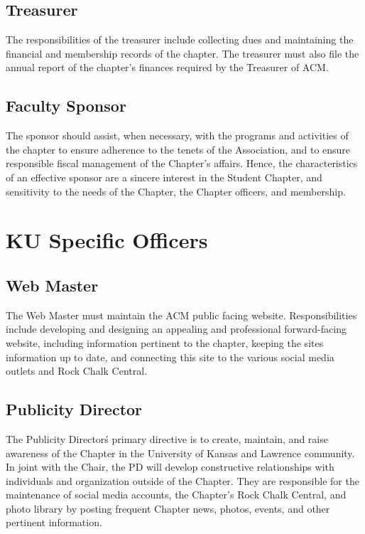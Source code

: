 \subsection*{Treasurer}
The responsibilities of the treasurer include collecting dues and maintaining
the financial and membership records of the chapter. The treasurer must also
file the annual report of the chapter's finances required by the Treasurer of
ACM.

\subsection*{Faculty Sponsor}
The sponsor should assist, when necessary, with the programs and activities of
the chapter to ensure adherence to the tenets of the Association, and to ensure
responsible fiscal management of the Chapter's affairs. Hence, the
characteristics of an effective sponsor are a sincere interest in the Student
Chapter, and sensitivity to the needs of the Chapter, the Chapter officers, and
membership.

\section*{KU Specific Officers}

\subsection*{Web Master}
The Web Master must maintain the ACM public facing website. Responsibilities
include developing and designing an appealing and professional forward-facing
website, including information pertinent to the chapter, keeping the site\’s
information up to date, and connecting this site to the various social media
outlets and Rock Chalk Central.

\subsection*{Publicity Director}
The Publicity Director\'s primary directive is to create, maintain, and raise
awareness of the Chapter in the University of Kansas and Lawrence community. In
joint with the Chair, the PD will develop constructive relationships with
individuals and organization outside of the Chapter. They are responsible for
the maintenance of social media accounts, the Chapter's Rock Chalk Central,
and photo library by posting frequent Chapter news, photos, events, and other
pertinent information.

